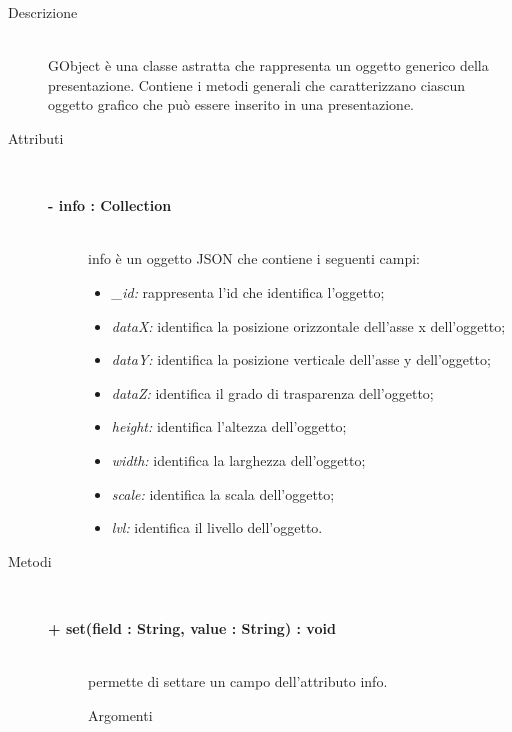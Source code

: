 \begin{description}
\item[Descrizione] \hfill \\
	GObject è una classe astratta che rappresenta un oggetto generico della presentazione. Contiene i metodi generali che caratterizzano ciascun oggetto grafico che può essere inserito in una presentazione.
	
\item[Attributi] \hfill \\
	\begin{description}
		\item[\textbf{- info : Collection			}] \hfill \\
			info è un oggetto JSON che contiene i seguenti campi:
				\begin{itemize}
					\item \textit{\_id:} rappresenta l'id che identifica l'oggetto;
					\item \textit{dataX:} identifica la posizione orizzontale dell'asse x dell'oggetto;
					\item \textit{dataY:} identifica la posizione verticale dell'asse y dell'oggetto;
					\item \textit{dataZ:} identifica il grado di trasparenza dell'oggetto; %
					\item \textit{height:} identifica l'altezza dell'oggetto;
					\item \textit{width:} identifica la larghezza dell'oggetto;
					\item \textit{scale:} identifica la scala dell'oggetto; %
					\item \textit{lvl:} identifica il livello dell'oggetto. %
				\end{itemize}
					 
		
	\end{description}
	
	
\item[Metodi] \hfill \\

	\begin{description}
		\item[\textbf{\color{blue}+ set(field : String, value : String) : void			}] \hfill \\
			permette di settare un campo dell'attributo info.
			
		\begin{description}
			\item[Argomenti] \hfill \\
				\begin{itemize}
				

\end{itemize}
\end{description}
\end{description}
\end{description}
